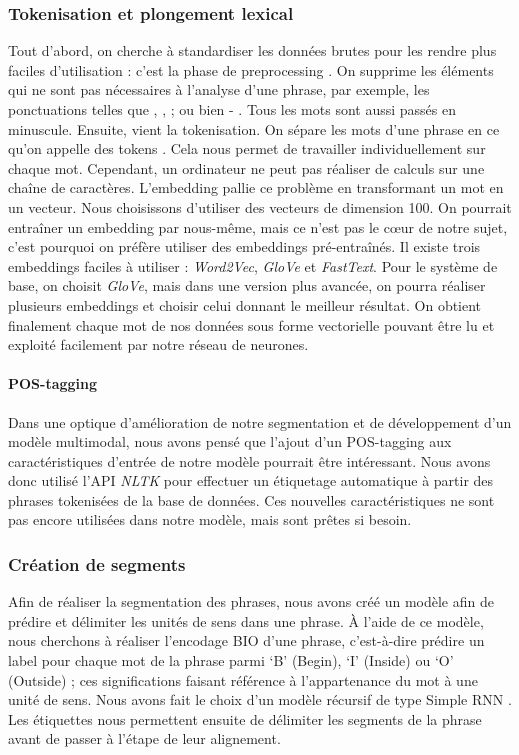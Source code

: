 \documentclass[a4paper, twoside, 11pt]{article}
\begin{document}
    \subsubsection{Tokenisation et plongement lexical}

Tout d’abord, on cherche à standardiser les données brutes pour les rendre plus faciles d'utilisation : c’est la phase de \og preprocessing \fg{}. On supprime les éléments qui ne sont pas nécessaires à l’analyse d’une phrase, par exemple, les ponctuations telles que \og , \fg{}, \og ; \fg{} ou bien \og - \fg{}. Tous les mots sont aussi passés en minuscule. Ensuite, vient la tokenisation. On sépare les mots d’une phrase en ce qu'on appelle des \og tokens \fg{}. Cela nous permet de travailler individuellement sur chaque mot.
Cependant, un ordinateur ne peut pas réaliser de calculs sur une chaîne de caractères. L’embedding pallie ce problème en transformant un mot en un vecteur. Nous choisissons d’utiliser des vecteurs de dimension 100. On pourrait entraîner un embedding par nous-même, mais ce n’est pas le cœur de notre sujet, c'est pourquoi on préfère utiliser des embeddings pré-entraînés. Il existe trois embeddings faciles à utiliser : \textit{Word2Vec}, \textit{GloVe} et \textit{FastText}. Pour le système de base, on choisit \textit{GloVe}, mais dans une version plus avancée, on pourra réaliser plusieurs embeddings et choisir celui donnant le meilleur résultat. On obtient finalement chaque mot de nos données sous forme vectorielle pouvant être lu et exploité facilement par notre réseau de neurones.

 \paragraph{POS-tagging}

Dans une optique d’amélioration de notre segmentation et de développement d'un modèle multimodal, nous avons pensé que l’ajout d’un \og POS-tagging \fg{} aux caractéristiques d’entrée de notre modèle pourrait être intéressant. Nous avons donc utilisé l’API \textit{NLTK} pour effectuer un étiquetage automatique à partir des phrases tokenisées de la base de données. Ces nouvelles caractéristiques ne sont pas encore utilisées dans notre modèle, mais sont prêtes si besoin.

    \subsubsection{Création de segments}
 Afin de réaliser la segmentation des phrases, nous avons créé un modèle afin de prédire et délimiter les unités de sens dans une phrase. À l’aide de ce modèle, nous cherchons à réaliser l'encodage BIO d’une phrase, c’est-à-dire prédire un label pour chaque mot de la phrase parmi ‘B’ (Begin), ‘I’ (Inside) ou ‘O’ (Outside) ; ces significations faisant référence à l’appartenance du mot à une unité de sens. Nous avons fait le choix d’un modèle récursif de type \og Simple RNN \fg{}. Les étiquettes nous permettent ensuite de délimiter les segments de la phrase avant de passer à l’étape de leur alignement.
\end{document}
